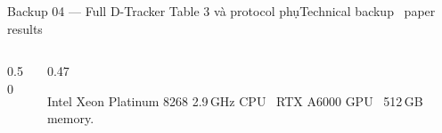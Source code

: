 \documentclass[aspectratio=169,11pt]{beamer}
\begin{document}
\begin{frame}[shrink=24]{Backup 04 --- Full D-Tracker Table 3 và protocol phụ}{Technical backup \textperiodcentered\ paper results}
\begin{columns}[T,onlytextwidth]
\begin{column}{0.50\textwidth}
\begin{intuition}
\end{intuition}
\end{column}
\begin{column}{0.47\textwidth}
\begin{questioncard}
  \par
  Intel Xeon Platinum 8268 2.9\,GHz CPU \textperiodcentered\ RTX A6000 GPU \textperiodcentered\ 512\,GB memory.
\end{questioncard}
\end{column}
\end{columns}
\vspace{2mm}
\end{frame}
\end{document}
